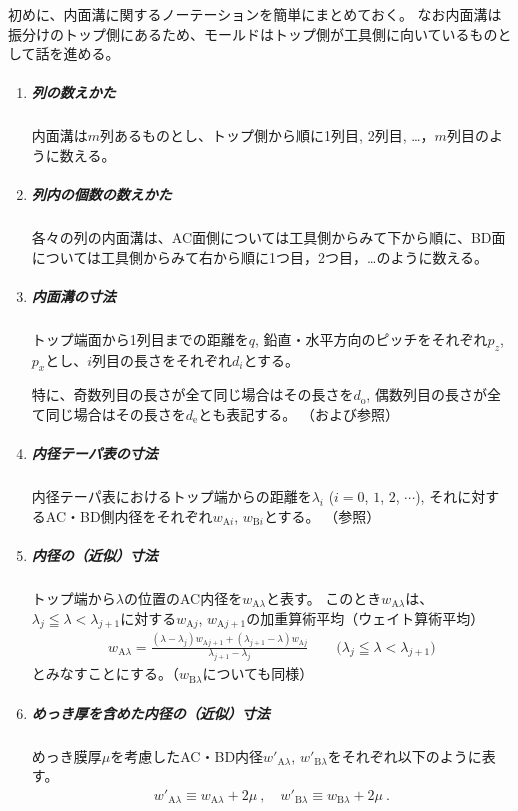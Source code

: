 初めに、内面溝に関するノーテーションを簡単にまとめておく。
なお内面溝は振分けのトップ側にあるため、モールドはトップ側が工具側に向いているものとして話を進める。
\begin{tcolorbox}[title={内面溝に関するノーテーション}, fonttitle=\gtfamily\bfseries, breakable, enhanced jigsaw]
\begin{enumerate}
\item
\subparagraph{列の数えかた}
内面溝は$m$列あるものとし、トップ側から順に1列目, 2列目, …，$m$列目のように数える。

\item
\subparagraph{列内の個数の数えかた}
各々の列の内面溝は、AC面側については工具側からみて下から順に、BD面については工具側からみて右から順に1つ目，2つ目，…のように数える。

\item
\subparagraph{内面溝の寸法}
トップ端面から1列目までの距離を$q$, 鉛直・水平方向のピッチをそれぞれ$p_z$, $p_x$とし、$i$列目の長さをそれぞれ$d_i$とする。

特に、奇数列目の長さが全て同じ場合はその長さを$d_\mathrm o$, 偶数列目の長さが全て同じ場合はその長さを$d_\mathrm e$とも表記する。
（および参照）

\item
\subparagraph{内径テーパ表の寸法}
内径テーパ表におけるトップ端からの距離を$\lambda_i$ ($i = 0$, $1$, $2$, $\cdots$), それに対するAC・BD側内径をそれぞれ$w_{\mathrm Ai}$, $w_{\mathrm Bi}$とする。
（参照）

\item
\subparagraph{内径の（近似）寸法}
トップ端から$\lambda$の位置のAC内径を$w_{\mathrm A\lambda}$と表す。
このとき$w_{\mathrm A\lambda}$は、$\lambda_j \leqq \lambda < \lambda_{j+1}$に対する$w_{\mathrm Aj}$, $w_{\mathrm Aj+1}$の加重算術平均（ウェイト算術平均）
\begin{align*}
  w_{\mathrm A\lambda}
  = \frac{(\lambda-\lambda_j)w_{\mathrm Aj+1}+(\lambda_{j+1}-\lambda)w_{\mathrm Aj}}{\lambda_{j+1}-\lambda_j}
  \qquad
  \Big(\lambda_j \leqq \lambda < \lambda_{j+1}\Big)
\end{align*}
とみなすことにする。（$w_{\mathrm B\lambda}$についても同様）

\item
\subparagraph{めっき厚を含めた内径の（近似）寸法}
めっき膜厚$\mu$を考慮したAC・BD内径$w'_{\mathrm A\lambda}$, $w'_{\mathrm B\lambda}$をそれぞれ以下のように表す。
\begin{align*}
  w'_{\mathrm A\lambda} \equiv w_{\mathrm A\lambda}+2\mu~, \quad
  w'_{\mathrm B\lambda} \equiv w_{\mathrm B\lambda}+2\mu~.
\end{align*}
\end{enumerate}
\end{tcolorbox}\noindent
